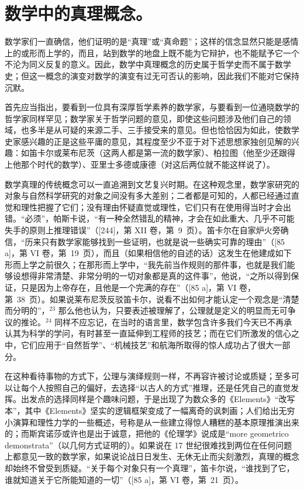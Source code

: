 \section*{数学中的真理概念。}
{}

数学家们一直确信，他们证明的是“真理”或“真命题”；这样的信念显然只能是感情上的或形而上学的，而且，站到数学的地盘上既不能为它辩护，也不能赋予它一个不沦为同义反复的意义。因此，数学中真理概念的历史属于哲学史而不属于数学史；但这一概念的演变对数学的演变有过无可否认的影响，因此我们不能对它保持沉默。

首先应当指出，要看到一位具有深厚哲学素养的数学家，与要看到一位通晓数学的哲学家同样罕见；数学家关于哲学问题的意见，即使这些问题涉及他们自己的领域，也多半是从可疑的来源二手、三手接受来的意见。但也恰恰因为如此，使数学史家感兴趣的正是这些平庸的意见，其程度至少不亚于对下述思想家独创见解的兴趣：如笛卡尔或莱布尼茨（这两人都是第一流的数学家）、柏拉图（他至少还跟得上他那个时代的数学）、亚里士多德或康德（对这后两位就不能这样说了）。

数学真理的传统概念可以一直追溯到文艺复兴时期。在这种观念里，数学家研究的对象与自然科学研究的对象之间没有多大差别；二者都是可知的，人都已经通过直觉和理性把握了它们；没有理由怀疑直觉或理性，它们只有在使用得当时才会出错。“必须”，帕斯卡说，“有一种全然错乱的精神，才会在如此重大、几乎不可能失手的原则上推理错误”（{[}244{]}，第 XII 卷，第~9~页）。笛卡尔在自家炉火旁确信，“历来只有数学家能够找到一些证明，也就是说一些确实可靠的理由”（{[}85 a{]}，第 VI 卷，第~19~页），而且（如果相信他的自述的话）这发生在他建成如下形而上学之前很久；在那形而上学中，“我先前当作规则的那件事，也就是我们能够设想得非常清楚、非常分明的一切对象都是真的这件事”，他说，“之所以得到保证，只是因为上帝存在，且他是一个完满的存在”（{[}85 a{]}，第 VI 卷，第~38~页）。如果说莱布尼茨反驳笛卡尔，说看不出如何才能认定一个观念是“清楚而分明的”，\(^{23}\) 那么他也认为，只要表述被理解了，公理就是定义的明显而无可争议的推论。\(^{24}\) 同样不应忘记，在当时的语言里，数学包含许多我们今天已不再承认其为科学的学问，有时甚至一直延伸到工程师的技艺；而在它们所激发的信心之中，它们应用于“自然哲学”、“机械技艺”和航海所取得的惊人成功占了很大一部分。

在这种看待事物的方式下，公理与演绎规则一样，不再容许被讨论或质疑；至多可以让每个人按照自己的偏好，去选择“以古人的方式”推理，还是任凭自己的直觉发挥。出发点的选择同样是个趣味问题，于是出现了为数众多的《Elements》“改写本”，其中《Elements》坚实的逻辑框架变成了一幅离奇的讽刺画；人们给出无穷小演算和理性力学的一些概述，号称是从一些建立得惊人糟糕的基本原理推演出来的；而斯宾诺莎或许也是出于诚意，把他的《伦理学》说成是“more geometrico demonstrata”（以几何方式证明的）。如果说在 17 世纪很难找到两位在任何问题上都意见一致的数学家，如果说论战日日发生、无休无止而尖刻激烈，真理的概念却始终不曾受到质疑。“关于每个对象只有一个真理”，笛卡尔说，“谁找到了它，谁就知道关于它所能知道的一切”（{[}85 a{]}，第 VI 卷，第~21~页）。

